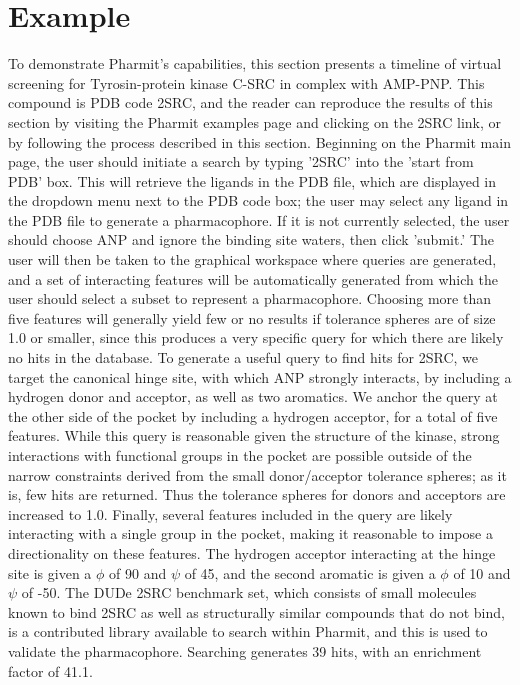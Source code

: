 \section{Example}

To demonstrate Pharmit's capabilities, this section presents a timeline of virtual screening for Tyrosin-protein kinase C-SRC in complex with AMP-PNP. This compound is PDB code 2SRC, and the reader can reproduce the results of this section by visiting the Pharmit examples page and clicking on the 2SRC link, or by following the process described in this section.  Beginning on the Pharmit main page, the user should initiate a search by typing '2SRC' into the 'start from PDB' box. This will retrieve the ligands in the PDB file, which are displayed in the dropdown menu next to the PDB code box; the user may select any ligand in the PDB file to generate a pharmacophore. If it is not currently selected, the user should choose ANP and ignore the binding site waters, then click 'submit.' The user will then be taken to the graphical workspace where queries are generated, and a set of interacting features will be automatically generated from which the user should select a subset to represent a pharmacophore. Choosing more than five features will generally yield few or no results if tolerance spheres are of size 1.0 or smaller, since this produces a very specific query for which there are likely no hits in the database. To generate a useful query to find hits for 2SRC, we target the canonical hinge site, with which ANP strongly interacts, by including a hydrogen donor and acceptor, as well as two aromatics. We anchor the query at the other side of the pocket by including a hydrogen acceptor, for a total of five features. While this query is reasonable given the structure of the kinase, strong interactions with functional groups in the pocket are possible outside of the narrow constraints derived from the small donor/acceptor tolerance spheres; as it is, few hits are returned. Thus the tolerance spheres for donors and acceptors are increased to 1.0. Finally, several features included in the query are likely interacting with a single group in the pocket, making it reasonable to impose a directionality on these features. The hydrogen acceptor interacting at the hinge site is given a $\phi$ of 90 and $\psi$ of 45, and the second aromatic is given a $\phi$ of 10 and $\psi$ of -50. The DUDe 2SRC benchmark set, which consists of small molecules known to bind 2SRC as well as structurally similar compounds that do not bind, is a contributed library available to search within Pharmit, and this is used to validate the pharmacophore. Searching generates 39 hits, with an enrichment factor of 41.1. 